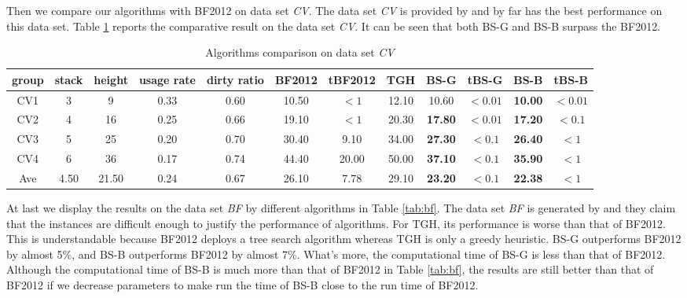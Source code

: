\documentclass[review,3p,times,authoryear,12pt]{elsarticle}
\begin{document}
Then we compare our algorithms with BF2012 on data set {\em CV}. The data set {\em CV} is provided by \cite{Caserta2009} and by far \cite{BF2012} has the best performance on this data set. Table \ref{tab:cv} reports the comparative result on the data set {\em CV}. It can be seen that both BS-G and BS-B surpass the BF2012.
\begin{table}[htbp]
\begin{footnotesize}
  \centering
  \caption{\label{tab:cv} Algorithms comparison on data set {\em CV}}
    \begin{tabular}{c|c|c|c|c|c|c|c|c|c|c|c}
    \hline
    group & stack & height & usage rate & dirty ratio & BF2012 & tBF2012 & TGH   & BS-G  & tBS-G & BS-B  & tBS-B \\
    \hline
    CV1   & 3  & 9  & 0.33  & 0.60  & 10.50  & $<1$    & 12.10  & 10.60  & $<0.01$ & \textbf{10.00}  & $<0.01$ \\
    CV2   & 4  & 16 & 0.25  & 0.66  & 19.10  & $<1$    & 20.30  & \textbf{17.80}  & $<0.01$ & \textbf{17.20}  & $<0.1$ \\
    CV3   & 5  & 25 & 0.20  & 0.70  & 30.40  & 9.10    & 34.00  & \textbf{27.30}  & $<0.1$  & \textbf{26.40} & $<1$ \\
    CV4   & 6  & 36 & 0.17  & 0.74  & 44.40  & 20.00   & 50.00  & \textbf{37.10}  & $<0.1$  & \textbf{35.90}  & $<1$ \\
    \hline
    Ave   & 4.50  & 21.50 & 0.24  & 0.67  & 26.10  & 7.78    & 29.10  & \textbf{23.20}  & $<0.1$  & \textbf{22.38}  & $<1$ \\
    \hline
    \end{tabular}%
\end{footnotesize}
\end{table}%

 At last we display the results on the data set {\em BF} by different algorithms in Table \ref{tab:bf}. The data set {\em BF} is generated by \cite{BF2012} and they claim that the instances are difficult enough to justify the performance of algorithms. For TGH, its performance is worse than that of BF2012. This is understandable because BF2012 deploys a tree search algorithm whereas TGH is only a greedy heuristic. BS-G outperforms BF2012 by almost 5\%, and BS-B outperforms BF2012 by almost 7\%.  What's more, the computational time of BS-G is less than that of BF2012. Although the computational time of BS-B is much more than that of BF2012 in Table \ref{tab:bf}, the results are still better than that of BF2012 if we decrease parameters to make run the time of BS-B close to the run time of BF2012.
\end{document}
